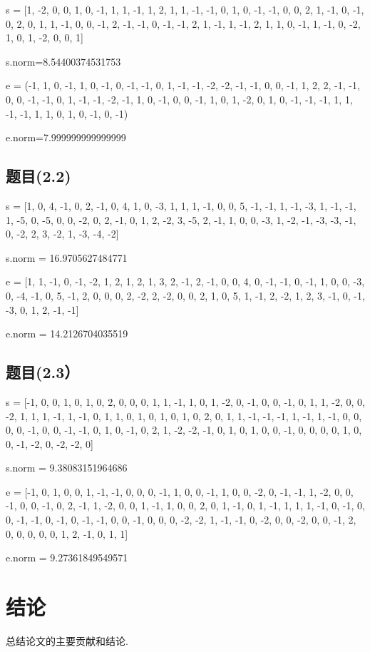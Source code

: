\documentclass[12pt,a4paper]{article}
\numberwithin{equation}{section}
\begin{document}
s = [1, -2, 0, 0, 1, 0, -1, 1, 1, -1, 1, 2, 1, 1,
-1, -1, 0, 1, 0, -1, -1, 0, 0, 2, 1, -1, 0, -1, 0, 2, 0, 1,
1, -1, 0, 0, -1, 2, -1, -1, 0, -1, -1, 2, 1, -1, 1, -1, 2, 1, 1, 0,
-1, 1, -1, 0, -2, 1, 0, 1, -2, 0, 0, 1]

s.norm=8.54400374531753

\hspace*{\fill}

e = (-1, 1, 0, -1, 1, 0, -1, 0, -1, -1, 0, 1, -1, -1, -2, -2, -1, -1, 0, 0, -1, 1, 2, 2, -1,
-1, 0, 0, -1, -1, 0, 1, -1, -1, -2, -1, 1, 0, -1, 0, 0, -1, 1, 0, 1, -2, 0, 1, 0, -1, -1,
-1, 1, 1, -1, -1, 1, 1, 0, 1, 0, -1, 0, -1)

e.norm=7.999999999999999

\subsection{题目(2.2)}

s = [1, 0, 4, -1, 0, 2, -1, 0, 4, 1, 0, -3, 1, 1, 1, -1, 0, 0, 5, -1, -1, 1, -1, -3, 1, -1, -1, 1, -5, 0, -5, 0, 0, -2, 0, 2, -1, 0, 1, 2, -2, 3, -5, 2, -1, 1, 0, 0, -3, 1, -2, -1, -3, -3, -1, 0, -2, 2, 3, -2, 1, -3, -4, -2]

s.norm = 16.9705627484771

e = [1, 1, -1, 0, -1, -2, 1, 2, 1, 2, 1, 3, 2, -1, 2, -1, 0, 0, 4, 0, -1, -1, 0, -1, 1, 0, 0, -3, 0, -4, -1, 0, 5, -1, 2, 0, 0, 0, 2, -2, 2, -2, 0, 0, 2, 1, 0, 5, 1, -1, 2, -2, 1, 2, 3, -1, 0, -1, -3, 0, 1, 2, -1, -1]

e.norm = 14.2126704035519

\subsection{题目(2.3）}

s = [-1, 0, 0, 1, 0, 1, 0, 2, 0, 0, 0, 1, 1, -1, 1, 0, 1, -2, 0, -1, 0, 0, -1, 0, 1, 1, -2, 0, 0, -2, 1, 1, 1, -1, 1, -1, 0, 1, 1, 0, 1, 0, 1, 0, 1, 0, 2, 0, 1, 1, -1, -1, -1, 1, -1, 1, -1, 0, 0, 0, 0, -1, 0, 0, -1, -1, 0, 1, 0, -1, 0, 2, 1, -2, -2, -1, 0, 1, 0, 1, 0, 0, -1, 0, 0, 0, 0, 1, 0, 0, -1, -2, 0, -2, -2, 0]

s.norm = 9.38083151964686

\hspace*{\fill}

e = [-1, 0, 1, 0, 0, 1, -1, -1, 0, 0, 0, -1, 1, 0, 0, -1, 1, 0, 0, -2, 0, -1, -1, 1, -2, 0, 0, -1, 0, 0, -1, 0, 2, -1, 1, -2, 0, 0, 1, -1, 1, 0, 0, 2, 0, 1, -1, 0, 1, -1, 1, 1, 1, -1, 0, -1, 0, 0, -1, -1, 0, -1, 0, -1, -1, 0, 0, -1, 0, 0, 0, -2, -2, 1, -1, -1, 0, -2, 0, 0, -2, 0, 0, -1, 2, 0, 0, 0, 0, 0, 1, 2, -1, 0, 1, 1]

e.norm = 9.27361849549571

\section{结论}

总结论文的主要贡献和结论.

\vspace{1em}

{\songti\fontsize{12pt}{18pt}\selectfont
	
}
%
\end{document}
